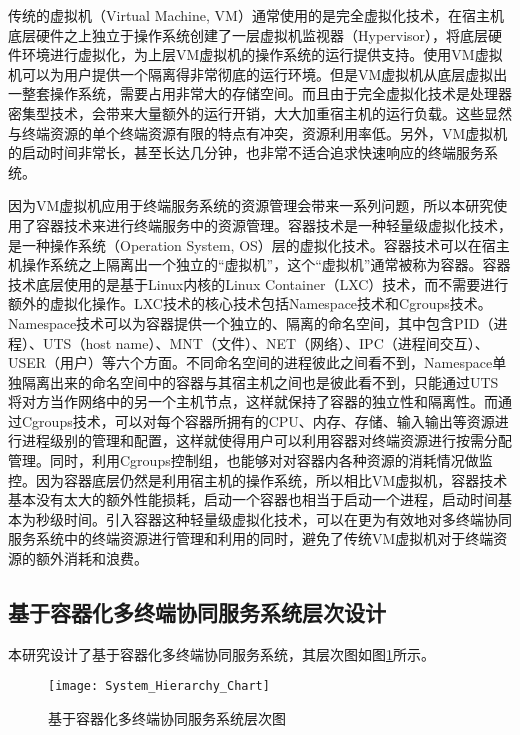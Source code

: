 传统的虚拟机（Virtual Machine, VM）通常使用的是完全虚拟化技术，在宿主机底层硬件之上独立于操作系统创建了一层虚拟机监视器（Hypervisor），将底层硬件环境进行虚拟化，为上层VM虚拟机的操作系统的运行提供支持。使用VM虚拟机可以为用户提供一个隔离得非常彻底的运行环境。但是VM虚拟机从底层虚拟出一整套操作系统，需要占用非常大的存储空间。而且由于完全虚拟化技术是处理器密集型技术，会带来大量额外的运行开销，大大加重宿主机的运行负载。这些显然与终端资源的单个终端资源有限的特点有冲突，资源利用率低。另外，VM虚拟机的启动时间非常长，甚至长达几分钟，也非常不适合追求快速响应的终端服务系统。

因为VM虚拟机应用于终端服务系统的资源管理会带来一系列问题，所以本研究使用了容器技术来进行终端服务中的资源管理。容器技术是一种轻量级虚拟化技术，是一种操作系统（Operation System, OS）层的虚拟化技术。容器技术可以在宿主机操作系统之上隔离出一个独立的“虚拟机”，这个“虚拟机”通常被称为容器。容器技术底层使用的是基于Linux内核的Linux Container（LXC）技术，而不需要进行额外的虚拟化操作。LXC技术的核心技术包括Namespace技术和Cgroups技术。Namespace技术可以为容器提供一个独立的、隔离的命名空间，其中包含PID（进程）、UTS（host name）、MNT（文件）、NET（网络）、IPC（进程间交互）、USER（用户）等六个方面。不同命名空间的进程彼此之间看不到，Namespace单独隔离出来的命名空间中的容器与其宿主机之间也是彼此看不到，只能通过UTS将对方当作网络中的另一个主机节点，这样就保持了容器的独立性和隔离性。而通过Cgroups技术，可以对每个容器所拥有的CPU、内存、存储、输入输出等资源进行进程级别的管理和配置，这样就使得用户可以利用容器对终端资源进行按需分配管理。同时，利用Cgroups控制组，也能够对对容器内各种资源的消耗情况做监控。因为容器底层仍然是利用宿主机的操作系统，所以相比VM虚拟机，容器技术基本没有太大的额外性能损耗，启动一个容器也相当于启动一个进程，启动时间基本为秒级时间。引入容器这种轻量级虚拟化技术，可以在更为有效地对多终端协同服务系统中的终端资源进行管理和利用的同时，避免了传统VM虚拟机对于终端资源的额外消耗和浪费。

\subsection{基于容器化多终端协同服务系统层次设计}
本研究设计了基于容器化多终端协同服务系统，其层次图如图\ref{fig:system_hierarchy}所示。
\begin{figure}[!htbp]
    \centering
    \texttt{[image: System\_Hierarchy\_Chart]}
    \caption{基于容器化多终端协同服务系统层次图}
    \label{fig:system_hierarchy}
\end{figure}

